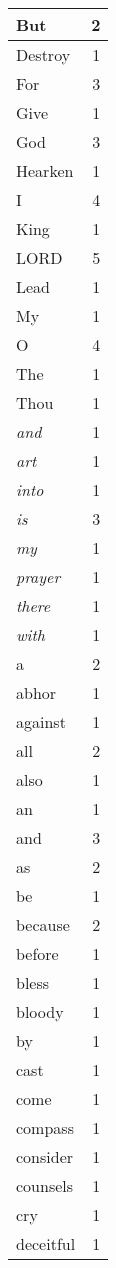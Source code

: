 \begin{center}
\begin{longtable}{l|r}
\hline \hline
\endlastfoot
But & 2 \\ \hline
Destroy & 1 \\ \hline
For & 3 \\ \hline
Give & 1 \\ \hline
God & 3 \\ \hline
Hearken & 1 \\ \hline
I & 4 \\ \hline
King & 1 \\ \hline
LORD & 5 \\ \hline
Lead & 1 \\ \hline
My & 1 \\ \hline
O & 4 \\ \hline
The & 1 \\ \hline
Thou & 1 \\ \hline
\emph{and} & 1 \\ \hline
\emph{art} & 1 \\ \hline
\emph{into} & 1 \\ \hline
\emph{is} & 3 \\ \hline
\emph{my} & 1 \\ \hline
\emph{prayer} & 1 \\ \hline
\emph{there} & 1 \\ \hline
\emph{with} & 1 \\ \hline
a & 2 \\ \hline
abhor & 1 \\ \hline
against & 1 \\ \hline
all & 2 \\ \hline
also & 1 \\ \hline
an & 1 \\ \hline
and & 3 \\ \hline
as & 2 \\ \hline
be & 1 \\ \hline
because & 2 \\ \hline
before & 1 \\ \hline
bless & 1 \\ \hline
bloody & 1 \\ \hline
by & 1 \\ \hline
cast & 1 \\ \hline
come & 1 \\ \hline
compass & 1 \\ \hline
consider & 1 \\ \hline
counsels & 1 \\ \hline
cry & 1 \\ \hline
deceitful & 1 \\ \hline

\end{longtable}
\end{center}
